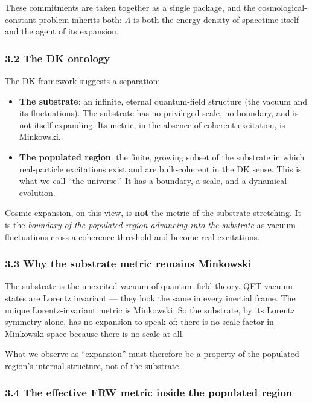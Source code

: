 \documentclass[
]{article}
\begin{document}
These commitments are taken together as a single package, and the
cosmological-constant problem inherits both: \(\Lambda\) is both the
energy density of spacetime itself and the agent of its expansion.

\subsubsection{3.2 The DK ontology}\label{the-dk-ontology}

The DK framework suggests a separation:

\begin{itemize}
\item
  \textbf{The substrate}: an infinite, eternal quantum-field structure
  (the vacuum and its fluctuations). The substrate has no privileged
  scale, no boundary, and is not itself expanding. Its metric, in the
  absence of coherent excitation, is Minkowski.
\item
  \textbf{The populated region}: the finite, growing subset of the
  substrate in which real-particle excitations exist and are
  bulk-coherent in the DK sense. This is what we call ``the universe.''
  It has a boundary, a scale, and a dynamical evolution.
\end{itemize}

Cosmic expansion, on this view, is \textbf{not} the metric of the
substrate stretching. It is the \emph{boundary of the populated region
advancing into the substrate} as vacuum fluctuations cross a coherence
threshold and become real excitations.

\subsubsection{3.3 Why the substrate metric remains
Minkowski}\label{why-the-substrate-metric-remains-minkowski}

The substrate is the unexcited vacuum of quantum field theory. QFT
vacuum states are Lorentz invariant --- they look the same in every
inertial frame. The unique Lorentz-invariant metric is Minkowski. So the
substrate, by its Lorentz symmetry alone, has no expansion to speak of:
there is no scale factor in Minkowski space because there is no scale at
all.

What we observe as ``expansion'' must therefore be a property of the
populated region's internal structure, not of the substrate.

\subsubsection{3.4 The effective FRW metric inside the populated
region}\label{the-effective-frw-metric-inside-the-populated-region}
\end{document}
